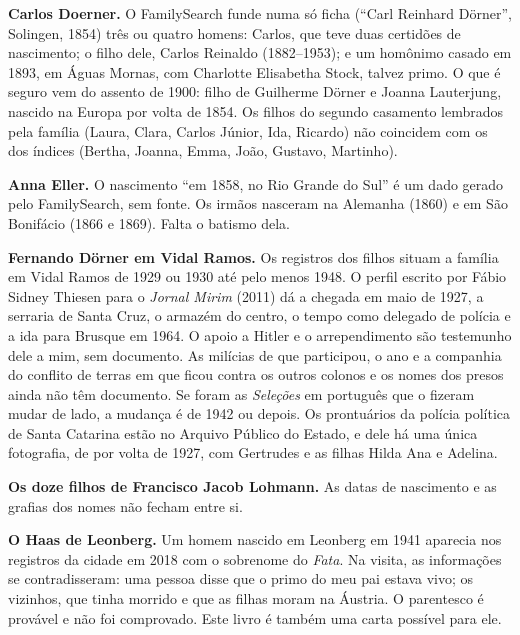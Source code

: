 \documentclass[
  brazilian,
  11pt,
  openany]{book}
\begin{document}
\textbf{Carlos Doerner.} O FamilySearch funde numa só ficha (``Carl
Reinhard Dörner'', Solingen, 1854) três ou quatro homens: Carlos, que
teve duas certidões de nascimento; o filho dele, Carlos Reinaldo
(1882--1953); e um homônimo casado em 1893, em Águas Mornas, com
Charlotte Elisabetha Stock, talvez primo. O que é seguro vem do assento
de 1900: filho de Guilherme Dörner e Joanna Lauterjung, nascido na
Europa por volta de 1854. Os filhos do segundo casamento lembrados pela
família (Laura, Clara, Carlos Júnior, Ida, Ricardo) não coincidem com os
dos índices (Bertha, Joanna, Emma, João, Gustavo, Martinho).

\textbf{Anna Eller.} O nascimento ``em 1858, no Rio Grande do Sul'' é um
dado gerado pelo FamilySearch, sem fonte. Os irmãos nasceram na Alemanha
(1860) e em São Bonifácio (1866 e 1869). Falta o batismo dela.

\textbf{Fernando Dörner em Vidal Ramos.} Os registros dos filhos situam
a família em Vidal Ramos de 1929 ou 1930 até pelo menos 1948. O perfil
escrito por Fábio Sidney Thiesen para o \emph{Jornal Mirim} (2011) dá a
chegada em maio de 1927, a serraria de Santa Cruz, o armazém do centro,
o tempo como delegado de polícia e a ida para Brusque em 1964. O apoio a
Hitler e o arrependimento são testemunho dele a mim, sem documento. As
milícias de que participou, o ano e a companhia do conflito de terras em
que ficou contra os outros colonos e os nomes dos presos ainda não têm
documento. Se foram as \emph{Seleções} em português que o fizeram mudar
de lado, a mudança é de 1942 ou depois. Os prontuários da polícia
política de Santa Catarina estão no Arquivo Público do Estado, e dele há
uma única fotografia, de por volta de 1927, com Gertrudes e as filhas
Hilda Ana e Adelina.

\textbf{Os doze filhos de Francisco Jacob Lohmann.} As datas de
nascimento e as grafias dos nomes não fecham entre si.

\textbf{O Haas de Leonberg.} Um homem nascido em Leonberg em 1941
aparecia nos registros da cidade em 2018 com o sobrenome do \emph{Fata}.
Na visita, as informações se contradisseram: uma pessoa disse que o
primo do meu pai estava vivo; os vizinhos, que tinha morrido e que as
filhas moram na Áustria. O parentesco é provável e não foi comprovado.
Este livro é também uma carta possível para ele.
\end{document}
